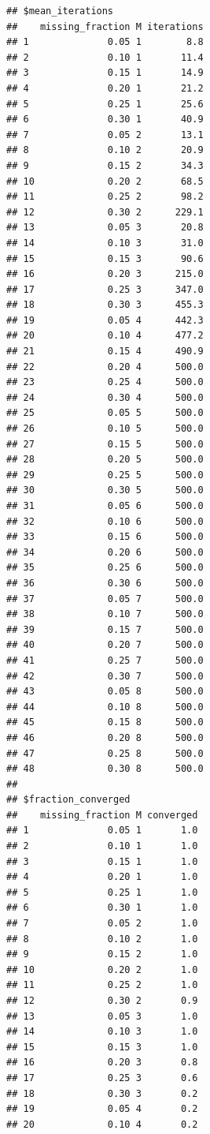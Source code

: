 \documentclass[
  11pt,
]{article}
\begin{document}
\begin{verbatim}
## $mean_iterations
##    missing_fraction M iterations
## 1              0.05 1        8.8
## 2              0.10 1       11.4
## 3              0.15 1       14.9
## 4              0.20 1       21.2
## 5              0.25 1       25.6
## 6              0.30 1       40.9
## 7              0.05 2       13.1
## 8              0.10 2       20.9
## 9              0.15 2       34.3
## 10             0.20 2       68.5
## 11             0.25 2       98.2
## 12             0.30 2      229.1
## 13             0.05 3       20.8
## 14             0.10 3       31.0
## 15             0.15 3       90.6
## 16             0.20 3      215.0
## 17             0.25 3      347.0
## 18             0.30 3      455.3
## 19             0.05 4      442.3
## 20             0.10 4      477.2
## 21             0.15 4      490.9
## 22             0.20 4      500.0
## 23             0.25 4      500.0
## 24             0.30 4      500.0
## 25             0.05 5      500.0
## 26             0.10 5      500.0
## 27             0.15 5      500.0
## 28             0.20 5      500.0
## 29             0.25 5      500.0
## 30             0.30 5      500.0
## 31             0.05 6      500.0
## 32             0.10 6      500.0
## 33             0.15 6      500.0
## 34             0.20 6      500.0
## 35             0.25 6      500.0
## 36             0.30 6      500.0
## 37             0.05 7      500.0
## 38             0.10 7      500.0
## 39             0.15 7      500.0
## 40             0.20 7      500.0
## 41             0.25 7      500.0
## 42             0.30 7      500.0
## 43             0.05 8      500.0
## 44             0.10 8      500.0
## 45             0.15 8      500.0
## 46             0.20 8      500.0
## 47             0.25 8      500.0
## 48             0.30 8      500.0
## 
## $fraction_converged
##    missing_fraction M converged
## 1              0.05 1       1.0
## 2              0.10 1       1.0
## 3              0.15 1       1.0
## 4              0.20 1       1.0
## 5              0.25 1       1.0
## 6              0.30 1       1.0
## 7              0.05 2       1.0
## 8              0.10 2       1.0
## 9              0.15 2       1.0
## 10             0.20 2       1.0
## 11             0.25 2       1.0
## 12             0.30 2       0.9
## 13             0.05 3       1.0
## 14             0.10 3       1.0
## 15             0.15 3       1.0
## 16             0.20 3       0.8
## 17             0.25 3       0.6
## 18             0.30 3       0.2
## 19             0.05 4       0.2
## 20             0.10 4       0.2

\end{verbatim}
\end{document}
